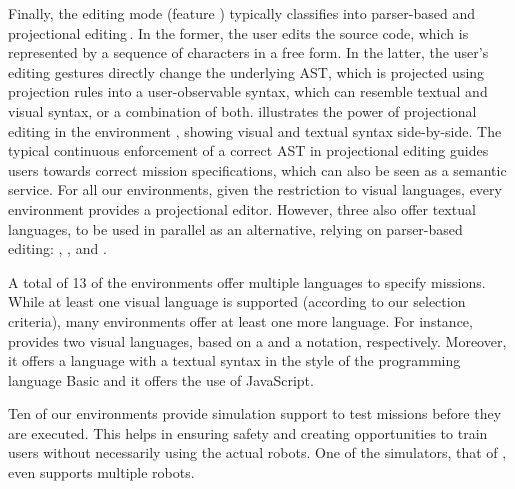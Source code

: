 
Finally, the editing mode (feature \feditingmode) typically classifies into parser-based and projectional editing\,\cite{voelter2014projectional,berger2016pe}. In the former, the user edits the source code, which is represented by a sequence of characters in a free form. In the latter, the user's editing gestures directly change the underlying AST, which is projected using projection rules into a user-observable syntax, which can resemble textual and visual syntax, or a combination of both.  illustrates the power of projectional editing in the environment \easyc, showing visual and textual syntax side-by-side. The typical continuous enforcement of a correct AST in projectional editing guides users towards correct mission specifications, which can also be seen as a semantic service. For all our environments, given the restriction to visual languages, every environment provides a projectional editor. However, three also offer textual languages, to be used in parallel as an alternative, relying on parser-based editing: \aseba, \vex, and \turtlebot.%

 A total of 13 of the environments offer multiple languages to specify missions. While at least one visual language is supported (according to our selection criteria), many environments offer at least one more language. For instance, \picaxe provides two visual languages, based on a \fflowchart and a \fblockly notation, respectively. Moreover, it offers a language with a textual syntax in the style of the programming language Basic and it offers the use of JavaScript.



 Ten of our environments provide simulation support to test missions before they are executed. This helps in ensuring safety and creating opportunities to train users without necessarily using the actual robots. One of the simulators, that of \missionlab, even supports multiple robots.


